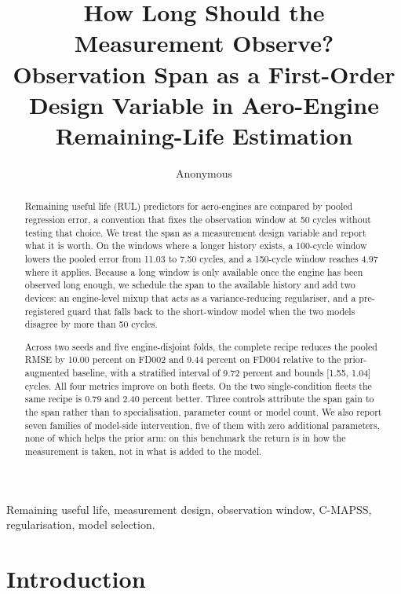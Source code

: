 \documentclass[journal]{IEEEtran}
\begin{document}
\title{How Long Should the Measurement Observe? Observation Span as a First-Order Design Variable in Aero-Engine Remaining-Life Estimation}

\author{Anonymous}

\maketitle

\begin{abstract}
Remaining useful life (RUL) predictors for aero-engines are compared by pooled regression error, a convention that fixes the observation window at 50 cycles without testing that choice. We treat the span as a measurement design variable and report what it is worth. On the windows where a longer history exists, a 100-cycle window lowers the pooled error from 11.03 to 7.50 cycles, and a 150-cycle window reaches 4.97 where it applies. Because a long window is only available once the engine has been observed long enough, we schedule the span to the available history and add two devices: an engine-level mixup that acts as a variance-reducing regulariser, and a pre-registered guard that falls back to the short-window model when the two models disagree by more than 50 cycles.

Across two seeds and five engine-disjoint folds, the complete recipe reduces the pooled RMSE by 10.00 percent on FD002 and 9.44 percent on FD004 relative to the prior-augmented baseline, with a stratified interval of 9.72 percent and bounds [1.55, 1.04] cycles. All four metrics improve on both fleets. On the two single-condition fleets the same recipe is 0.79 and 2.40 percent better. Three controls attribute the span gain to the span rather than to specialisation, parameter count or model count. We also report seven families of model-side intervention, five of them with zero additional parameters, none of which helps the prior arm: on this benchmark the return is in how the measurement is taken, not in what is added to the model.

\end{abstract}

\begin{IEEEkeywords}
Remaining useful life, measurement design, observation window, C-MAPSS, regularisation, model selection.
\end{IEEEkeywords}

\section{Introduction}
\end{document}
